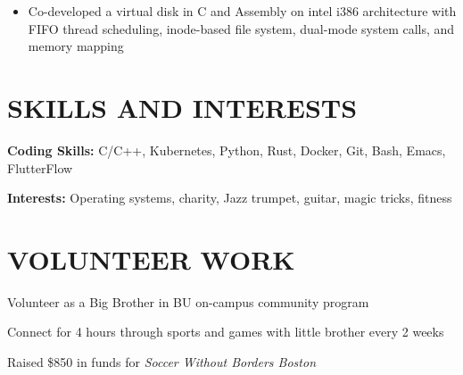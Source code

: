 \documentclass[10pt]{article}
\begin{document}
\begin{FlushLeft}
  \begin{itemize}
  \item Co-developed a virtual disk in C and Assembly on intel i386 architecture with FIFO thread scheduling, inode-based file system, dual-mode system calls, and memory mapping
  \end{itemize}
  
  \section{SKILLS AND INTERESTS}
  \vspace{-0.75em}
  \begin{itemize}{
    \item {\bf Coding Skills:} C/C++, Kubernetes, Python, Rust, Docker, Git, Bash, Emacs, FlutterFlow
    \item {\bf Interests:} Operating systems, charity, Jazz trumpet, guitar, magic tricks, fitness
    }
  \end{itemize}

  \section{VOLUNTEER WORK}

  \begin{itemize}{
    \item Volunteer as a Big Brother in BU on-campus community program
    \item Connect for 4 hours through sports and games with little brother every 2 weeks
    }
  \end{itemize}

  
  \begin{itemize}{
      
    \item Raised \$850 in funds for \textit{Soccer Without Borders Boston}
    }
  \end{itemize}
  

\end{FlushLeft}
\end{document}
